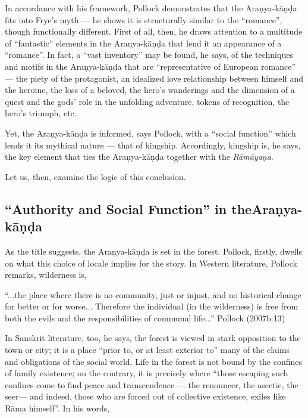 In accordance with his framework, Pollock demonstrates that the Araṇya-kāṇḍa fits into Frye’s myth --- he shows it is structurally similar to the “romance”, though functionally different. First of all, then, he draws attention to a multitude of “fantastic” elements in the Araṇya-kāṇḍa that lend it an appearance of a “romance”. In fact, a “vast inventory” may be found, he says, of the techniques and motifs in the Araṇya-kāṇḍa that are “representative of European romance” --- the piety of the protagonist, an idealized love relationship between himself and the heroine, the loss of a beloved, the hero’s wanderings and the dimension of a quest and the gods’ role in the unfolding adventure, tokens of recognition, the hero’s triumph, etc.  

Yet, the Araṇya-kāṇḍa is informed, says Pollock, with a “social function” which lends it its mythical nature --- that of kingship. Accordingly, kingship is, he says, the key element that ties the Araṇya-kāṇḍa together with the {\sl Rāmāyaṇa}. 

Let us, then, examine the logic of this conclusion. 

\subsection{“Authority and Social Function” in the\hfil\break Araṇya-kāṇḍa}\label{sec2.3.1}

As the title suggests, the Araṇya-kāṇḍa is set in the forest. Pollock, firstly, dwells on what this choice of locale implies for the story. In Western literature, Pollock remarks, wilderness is, 

\begin{myquote}
“...the place where there is no community, just or injust, and no historical change for better or for worse... Therefore the individual (in the wilderness) is free from both the evils and the responsibilities of communal life...”
\hfill Pollock (2007b:13)
\end{myquote}

In Sanskrit literature, too, he says, the forest is viewed in stark opposition to the town or city; it is a place “prior to, or at least exterior to” many of the claims and obligations of the social world. Life in the forest is not bound by the confines of family existence; on the contrary, it is precisely where “those escaping such confines come to find peace and transcendence --- the renouncer, the ascetic, the seer--- and indeed, those who are forced out of collective existence, exiles like Rāma himself”. In his words,

